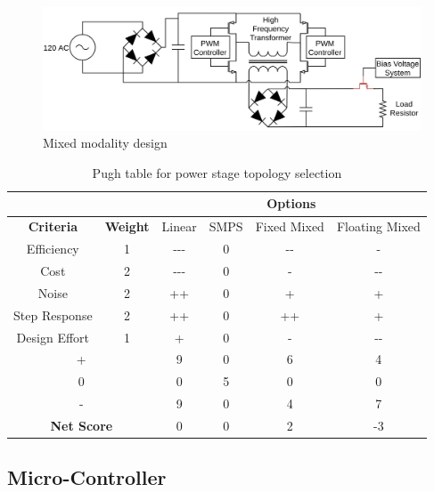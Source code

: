 \documentclass[12pt]{article}
\begin{document}
\begin{figure}[H]
    \includegraphics[width=\textwidth]{mixed}
    \caption{Mixed modality design}
    \label{fig:mixed}
\end{figure}
\begin{table}[H]
    \centering
\begin{tabular}{ |c|c||c|c|c|c|  }
    \cline{3-6}
    \multicolumn{1}{c}{}& \multicolumn{1}{c}{}&  \multicolumn{4}{|c|}{\textbf{Options}} \\
    \hline
    \textbf{Criteria} & \textbf{Weight} & Linear & SMPS & Fixed Mixed & Floating Mixed \\ 
    \hline
    Efficiency & 1 & {-}{-}{-} & 0 & {-}{-} & - \\
    Cost & 2 & {-}{-}{-} & 0 & {-} & {-}{-} \\
    Noise & 2 & ++ & 0 & + & + \\
    Step Response & 2 & ++ & 0 & ++ & + \\
    Design Effort & 1 & + & 0 & - & {-}{-} \\ 
    \hline
    \hline
    \multicolumn{2}{|c||}{+} & 9 & 0 & 6 & 4\\
    \multicolumn{2}{|c||}{0} & 0 & 5 & 0 & 0\\
    \multicolumn{2}{|c||}{-} & 9 & 0 & 4 & 7\\
    \hline
    \hline
    \multicolumn{2}{|c||}{\textbf{Net Score}} & 0 & 0 & 2 & -3\\
    \hline
\end{tabular}
\caption{Pugh table for power stage topology selection}
\label{tab:power}
\end{table}


\subsection {Micro-Controller}
\end{document}
